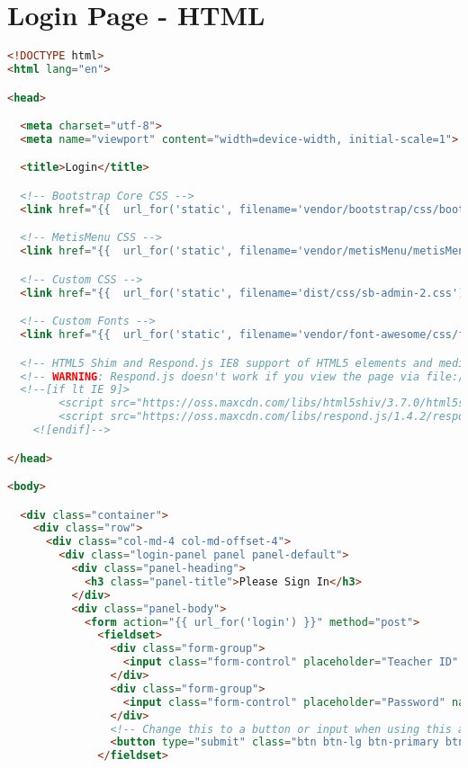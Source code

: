 \section{Login Page - HTML}
\begin{lstlisting}[language=HTML]
<!DOCTYPE html>
<html lang="en">

<head>

  <meta charset="utf-8">
  <meta name="viewport" content="width=device-width, initial-scale=1">

  <title>Login</title>

  <!-- Bootstrap Core CSS -->
  <link href="{{  url_for('static', filename='vendor/bootstrap/css/bootstrap.min.css') }}" rel="stylesheet">

  <!-- MetisMenu CSS -->
  <link href="{{  url_for('static', filename='vendor/metisMenu/metisMenu.min.css') }}" rel="stylesheet">

  <!-- Custom CSS -->
  <link href="{{  url_for('static', filename='dist/css/sb-admin-2.css') }}" rel="stylesheet">

  <!-- Custom Fonts -->
  <link href="{{  url_for('static', filename='vendor/font-awesome/css/font-awesome.min.css') }}" rel="stylesheet" type="text/css">

  <!-- HTML5 Shim and Respond.js IE8 support of HTML5 elements and media queries -->
  <!-- WARNING: Respond.js doesn't work if you view the page via file:// -->
  <!--[if lt IE 9]>
        <script src="https://oss.maxcdn.com/libs/html5shiv/3.7.0/html5shiv.js"></script>
        <script src="https://oss.maxcdn.com/libs/respond.js/1.4.2/respond.min.js"></script>
    <![endif]-->

</head>

<body>

  <div class="container">
    <div class="row">
      <div class="col-md-4 col-md-offset-4">
        <div class="login-panel panel panel-default">
          <div class="panel-heading">
            <h3 class="panel-title">Please Sign In</h3>
          </div>
          <div class="panel-body">
            <form action="{{ url_for('login') }}" method="post">
              <fieldset>
                <div class="form-group">
                  <input class="form-control" placeholder="Teacher ID" name="teacher_id" type="text" autofocus>
                </div>
                <div class="form-group">
                  <input class="form-control" placeholder="Password" name="password" type="password" value="">
                </div>
                <!-- Change this to a button or input when using this as a form -->
                <button type="submit" class="btn btn-lg btn-primary btn-block btn-outline" value="Submit">Login</button>
              </fieldset>


\end{lstlisting}
